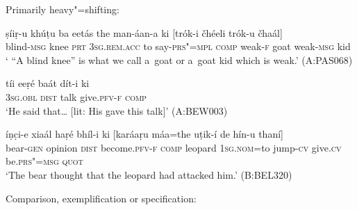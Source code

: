 \clearpage
{} Primarily heavy"=shifting:

\begin{exe}
\ex
\label{ex:13-228}
\gll ṣíiṛ-u khúṭu ba eetás the  man-áan-a ki [trók-i čhéeli trók-u čhaál] \\
blind-\textsc{msg} knee \textsc{prt} \textsc{3sg.rem.acc} to say-\textsc{prs"=mpl} \textsc{comp} weak-\textsc{f} goat weak-\textsc{msg} kid \\
\glt ` ``A blind knee'' is what we call a~goat or a~goat kid which is weak.' (A:PAS068)

\ex
\label{ex:13-229}
\gll tíi eeṛé baát dít-i ki  \\
\textsc{3sg.obl} \textsc{dist} talk give.\textsc{pfv-f} \textsc{comp}  \\
\glt `He said that{\ldots} [lit: His gave this talk]' (A:BEW003)

\ex
\label{ex:13-230}
\gll íṇc̣i-e xiaál haṛé bhíl-i  ki [karáaṛu máa=the uṭik-í de hín-u thaní] \\
bear-\textsc{gen} opinion \textsc{dist} become.\textsc{pfv-f} \textsc{comp} leopard \textsc{1sg.nom=}to jump-\textsc{cv} give.\textsc{cv} be.\textsc{prs"=msg} \textsc{quot} \\
\glt `The bear thought that the leopard had attacked him.' (B:BEL320) 
\end{exe}

 Comparison, exemplification or specification:

